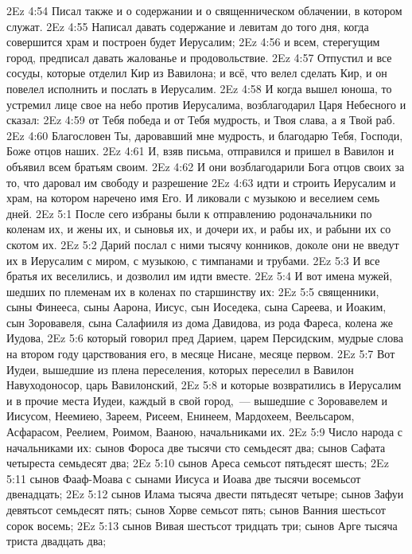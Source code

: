 \vs 2Ez 4:54 Писал также и о содержании и о священническом облачении, в котором служат.
\vs 2Ez 4:55 Написал давать содержание и левитам до того дня, когда совершится храм и построен будет Иерусалим;
\vs 2Ez 4:56 и всем, стерегущим город, предписал давать жалованье и продовольствие.
\vs 2Ez 4:57 Отпустил и все сосуды, которые отделил Кир из Вавилона; и всё, что велел сделать Кир, и он повелел исполнить и послать в Иерусалим.
\rsbpar\vs 2Ez 4:58 И когда вышел юноша, то устремил лице свое на небо против Иерусалима, возблагодарил Царя Небесного и сказал:
\vs 2Ez 4:59 от Тебя победа и от Тебя мудрость, и Твоя слава, а я Твой раб.
\vs 2Ez 4:60 Благословен Ты, даровавший мне мудрость, и благодарю Тебя, Господи, Боже отцов наших.
\vs 2Ez 4:61 И, взяв письма, отправился и пришел в Вавилон и объявил всем братьям своим.
\vs 2Ez 4:62 И они возблагодарили Бога отцов своих за то, что даровал им свободу и разрешение
\vs 2Ez 4:63 идти и строить Иерусалим и храм, на котором наречено имя Его. И ликовали с музыкою и веселием семь дней.
\vs 2Ez 5:1 После сего избраны были к отправлению родоначальники по коленам их, и жены их, и сыновья их, и дочери их, и рабы их, и рабыни их со скотом их.
\vs 2Ez 5:2 Дарий послал с ними тысячу конников, доколе они не введут их в Иерусалим с миром, с музыкою, с тимпанами и трубами.
\vs 2Ez 5:3 И все братья их веселились, и  дозволил им идти вместе.
\rsbpar\vs 2Ez 5:4 И вот имена мужей, шедших по племенам их в коленах по старшинству их:
\vs 2Ez 5:5 священники, сыны Финееса, сыны Аарона, Иисус, сын Иоседека, сына Сареева, и Иоаким, сын Зоровавеля, сына Салафииля из дома Давидова, из рода Фареса, колена же Иудова,
\vs 2Ez 5:6 который говорил пред Дарием, царем Персидским, мудрые слова на втором году царствования его, в месяце Нисане, месяце первом.
\vs 2Ez 5:7 Вот Иудеи, вышедшие из плена переселения, которых переселил в Вавилон Навуходоносор, царь Вавилонский,
\vs 2Ez 5:8 и которые возвратились в Иерусалим и в прочие места Иудеи, каждый в свой город,~--- вышедшие с Зоровавелем и Иисусом, Неемиею, Зареем, Рисеем, Енинеем, Мардохеем, Веельсаром, Асфарасом, Реелием, Роимом, Вааною, начальниками их.
\rsbpar\vs 2Ez 5:9 Число народа с начальниками их: сынов Фороса две тысячи сто семьдесят два; сынов Сафата четыреста семьдесят два;
\vs 2Ez 5:10 сынов Ареса семьсот пятьдесят шесть;
\vs 2Ez 5:11 сынов Фааф-Моава с сынами Иисуса и Иоава две тысячи восемьсот двенадцать;
\vs 2Ez 5:12 сынов Илама тысяча двести пятьдесят четыре; сынов Зафуи девятьсот семьдесят пять; сынов Хорве семьсот пять; сынов Ванния шестьсот сорок восемь;
\vs 2Ez 5:13 сынов Вивая шестьсот тридцать три; сынов Арге тысяча триста двадцать два;
